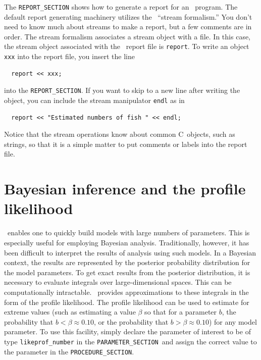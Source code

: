 \documentclass{admbmanual}
\newcommand\PS{\texttt{PARAMETER\_SECTION}}
\newcommand\PROS{\texttt{PROCEDURE\_SECTION}}
\newcommand\apl{profile likelihood}
\begin{document}
The \texttt{REPORT\_SECTION} shows how to generate a report for an \ADM\
program. The default report generating machinery utilizes the \cplus\ ``stream
formalism.'' You don't need to know much about streams to make a report, but a
few comments are in order. The stream formalism associates a stream object with
a file. In this case, the stream object associated with the \ADM\ report file is
\texttt{report}. To write an object \texttt{xxx} into the report file, you
insert the line
\begin{lstlisting}
  report << xxx;
\end{lstlisting}
into the \texttt{REPORT\_SECTION}. If you want to skip to a new line after
writing the object, you can include the stream manipulator \texttt{endl} as in
\begin{lstlisting}
  report << "Estimated numbers of fish " << endl;
\end{lstlisting}
Notice that the stream operations know about common C~objects, such as strings,
so that it is a simple matter to put comments or labels into the report file.
\X{endl@\texttt{endl} stream manipulator}

\section{Bayesian inference and the \apl}\label{sec:bayesian-inference}

\ADM\ enables one to quickly build models with large numbers of parameters. This
is especially useful for employing Bayesian analysis. Traditionally, however, it
has been difficult to interpret the results of analysis using such models. In a
Bayesian context, the results are represented by the posterior probability
distribution for the model parameters. To get exact results from the posterior
distribution, it is necessary to evaluate integrals over large-dimensional
spaces. This can be computationally intractable. \ADM\ provides approximations
to these integrals in the form of the profile likelihood. The profile likelihood
can be used to estimate for extreme values (such as estimating a value $\beta$
so that for a parameter $b$, the probability that $b<\beta \approx 0.10$, or the
probability that $b>\beta \approx 0.10$) for any model parameter. To use this
facility, simply declare the parameter of interest to be of type
\texttt{likeprof\_number} in the \PS\ and assign the correct value to the
parameter in the \PROS.
\end{document}
